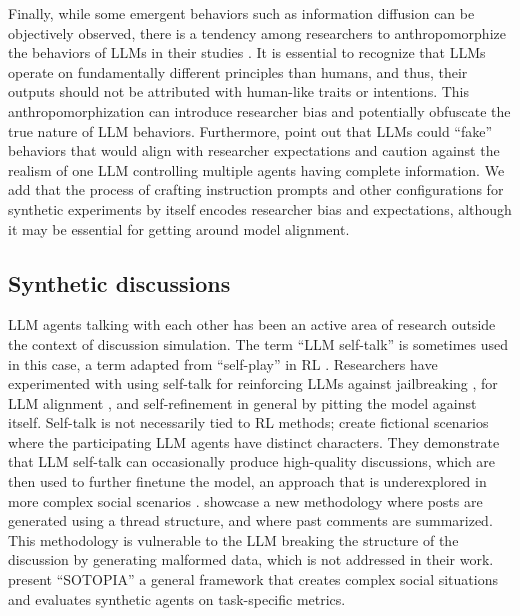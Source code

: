 Finally, while some emergent behaviors such as information diffusion can be objectively observed, there is a tendency among researchers to anthropomorphize the behaviors of \acp{LLM} in their studies \cite{rossi_2024}. It is essential to recognize that \acp{LLM} operate on fundamentally different principles than humans, and thus, their outputs should not be attributed with human-like traits or intentions. This anthropomorphization can introduce researcher bias and potentially obfuscate the true nature of \ac{LLM} behaviors. Furthermore, \citet{anthis_2025} point out that \acp{LLM} could “fake” behaviors that would align with researcher expectations and \citet{zhou-etal-2024-real} caution against the realism of one \ac{LLM} controlling multiple agents having complete information. We add that the process of crafting instruction prompts and other configurations for synthetic experiments by itself encodes researcher bias and expectations, although it may be essential for getting around model alignment.


\subsection{Synthetic discussions}
\label{ssec:related:discussions}

\ac{LLM} agents talking with each other has been an active area of research outside the context of discussion simulation. The term “\ac{LLM} self-talk” is sometimes used in this case, a term adapted from “self-play” in \ac{RL} \citep{cheng-self-play, ulmer2024}. Researchers have experimented with using self-talk for reinforcing \acp{LLM} against jailbreaking \cite{liu2024largelanguagemodelsagents, cheng-self-play, zheng2024optimalllmalignmentsusing}, for \ac{LLM} alignment \cite{Bai2022ConstitutionalAH, collective_constitution}, and self-refinement in general \cite{Madaan2023SelfRefineIR, lambert2024} by pitting the model against itself. Self-talk is not necessarily tied to \ac{RL} methods; \citet{ulmer2024} create fictional scenarios where the participating \ac{LLM} agents have distinct characters. They demonstrate that \ac{LLM} self-talk can occasionally produce high-quality discussions, which are then used to further finetune the model, an approach that is underexplored in more complex social scenarios \cite{zhou-etal-2024-real}. \citet{balog_2024} showcase a new methodology where posts are generated using a thread structure, and where past comments are summarized. This methodology is vulnerable to the \ac{LLM} breaking the structure of the discussion by generating malformed data, which is not addressed in their work. \citet{zhou_2024_sotopia} present “SOTOPIA” a general framework that creates complex social situations and evaluates synthetic agents on task-specific metrics.

